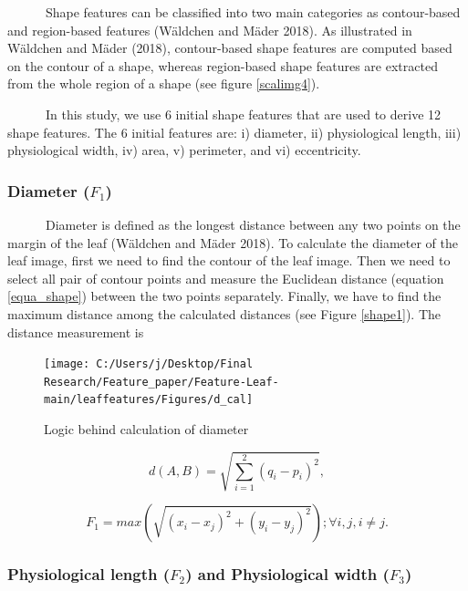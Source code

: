 \documentclass{article}
\begin{document}
~~~~~~Shape features can be classified into two main categories as
contour-based and region-based features (Wäldchen and Mäder 2018). As
illustrated in Wäldchen and Mäder (2018), contour-based shape features
are computed based on the contour of a shape, whereas region-based shape
features are extracted from the whole region of a shape (see figure
\ref{scalimg4}).

~~~~~~In this study, we use 6 initial shape features that are used to
derive 12 shape features. The 6 initial features are: i) diameter, ii)
physiological length, iii) physiological width, iv) area, v) perimeter,
and vi) eccentricity.

\hypertarget{diameter-f_1}{%
\subsubsection{\texorpdfstring{Diameter
(\(F_1\))}{Diameter (F\_1)}}\label{diameter-f_1}}

~~~~~~Diameter is defined as the longest distance between any two points
on the margin of the leaf (Wäldchen and Mäder 2018). To calculate the
diameter of the leaf image, first we need to find the contour of the
leaf image. Then we need to select all pair of contour points and
measure the Euclidean distance (equation \ref{equa_shape}) between the
two points separately. Finally, we have to find the maximum distance
among the calculated distances (see Figure \ref{shape1}). The distance
measurement is

\begin{figure}[!ht]

{\centering \texttt{[image: C:/Users/j/Desktop/Final Research/Feature\_paper/Feature-Leaf-main/leaffeatures/Figures/d\_cal]} 

}

\caption{\label{shape1}Logic behind calculation of diameter}\label{fig:unnamed-chunk-14}
\end{figure}

\begin{equation}
    d\left( A,B\right)   = \sqrt {\sum _{i=1}^{2}  \left( q_{i}-p_{i}\right)^2},
\label{equa_shape}
\end{equation}

\begin{equation}
   F_1 = max(\sqrt{(x_i-x_j)^2 + (y_i-y_j)^2}); \forall i,j, i \neq j.
\label{equa_F1}
\end{equation}

\hypertarget{physiological-length-f_2-and-physiological-width-f_3}{%
\subsubsection{\texorpdfstring{Physiological length (\(F_2\)) and
Physiological width
(\(F_3\))}{Physiological length (F\_2) and Physiological width (F\_3)}}\label{physiological-length-f_2-and-physiological-width-f_3}}
\end{document}
